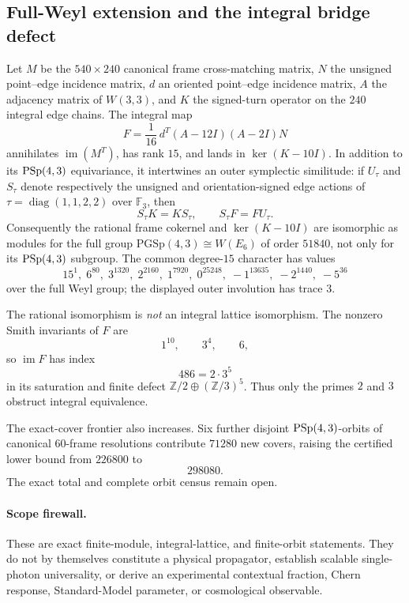 \subsection*{Full-Weyl extension and the integral bridge defect}

Let $M$ be the $540\times240$ canonical frame cross-matching matrix, $N$ the
unsigned point--edge incidence matrix, $d$ an oriented point--edge incidence
matrix, $A$ the adjacency matrix of $W(3,3)$, and $K$ the signed-turn operator
on the $240$ integral edge chains. The integral map
\[
  F=\frac1{16}\,d^{T}(A-12I)(A-2I)N
\]
annihilates $\operatorname{im}(M^{T})$, has rank $15$, and lands in
$\ker(K-10I)$. In addition to its $\mathrm{PSp}(4,3)$ equivariance, it intertwines an
outer symplectic similitude: if $U_{\tau}$ and $S_{\tau}$ denote respectively
the unsigned and orientation-signed edge actions of
$\tau=\operatorname{diag}(1,1,2,2)$ over $\mathbb F_{3}$, then
\[
  S_{\tau}K=KS_{\tau},
  \qquad
  S_{\tau}F=FU_{\tau}.
\]
Consequently the rational frame cokernel and $\ker(K-10I)$ are isomorphic as
modules for the full group
$\mathrm{PGSp}(4,3)\cong W(E_{6})$ of order $51840$, not only for its
$\mathrm{PSp}(4,3)$ subgroup. The common degree-$15$ character has values
\[
  15^1,\;6^{80},\;3^{1320},\;2^{2160},\;1^{7920},\;0^{25248},
  \;-1^{13635},\;-2^{1440},\;-5^{36}
\]
over the full Weyl group; the displayed outer involution has trace $3$.

The rational isomorphism is \emph{not} an integral lattice isomorphism. The
nonzero Smith invariants of $F$ are
\[
  1^{10},\qquad 3^{4},\qquad 6,
\]
so $\operatorname{im}F$ has index
\[
  486=2\cdot3^{5}
\]
in its saturation and finite defect
$\mathbb Z/2\oplus(\mathbb Z/3)^{5}$. Thus only the primes $2$ and $3$
obstruct integral equivalence.

The exact-cover frontier also increases. Six further disjoint
$\mathrm{PSp}(4,3)$-orbits of canonical $60$-frame resolutions contribute $71280$
new covers, raising the certified lower bound from $226800$ to
\[
  \boxed{298080}.
\]
The exact total and complete orbit census remain open.

\paragraph{Scope firewall.}
These are exact finite-module, integral-lattice, and finite-orbit statements.
They do not by themselves constitute a physical propagator, establish scalable
single-photon universality, or derive an experimental contextual fraction,
Chern response, Standard-Model parameter, or cosmological observable.
